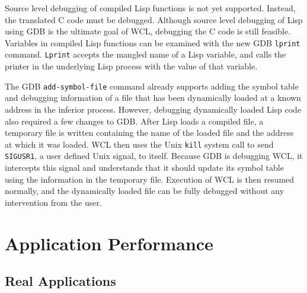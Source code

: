 
Source level debugging of compiled Lisp functions is not yet
supported.  Instead, the translated C code must be debugged. Although
source level debugging of Lisp using GDB is the ultimate goal of WCL,
debugging the C code is still feasible.  Variables in compiled Lisp
functions can be examined with the new GDB {\tt lprint} command. {\tt Lprint}
accepts the mangled name of a Lisp variable, and calls the
printer in the underlying Lisp process with the value of that
variable. 

The GDB {\tt add-symbol-file} command already supports adding the
symbol table and debugging information of a file that has been
dynamically loaded at a known address in the inferior process.
However, debugging dynamically loaded Lisp code also required a few
changes to GDB.  After Lisp loads a compiled file, a temporary file is
written containing the name of the loaded file and the address at
which it was loaded. WCL then uses the Unix {\tt kill} system call to
send {\tt SIGUSR1}, a user defined Unix signal, to itself. Because GDB
is debugging WCL, it intercepts this signal and understands that it
should update its symbol table using the information in the temporary
file. Execution of WCL is then resumed normally, and the dynamically
loaded file can be fully debugged without any intervention from the
user.

\section{Application Performance}

\subsection{Real Applications}

